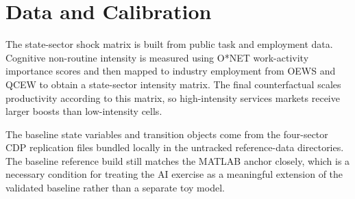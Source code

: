 \section{Data and Calibration}

The state-sector shock matrix is built from public task and employment data. Cognitive
non-routine intensity is measured using O*NET work-activity importance scores and then mapped to
industry employment from OEWS and QCEW to obtain a state-sector intensity matrix. The final
counterfactual scales productivity according to this matrix, so high-intensity services markets
receive larger boosts than low-intensity cells.

The baseline state variables and transition objects come from the four-sector CDP replication
files bundled locally in the untracked reference-data directories. The baseline reference build
still matches the MATLAB anchor closely, which is a necessary condition for treating the AI
exercise as a meaningful extension of the validated baseline rather than a separate toy model.


